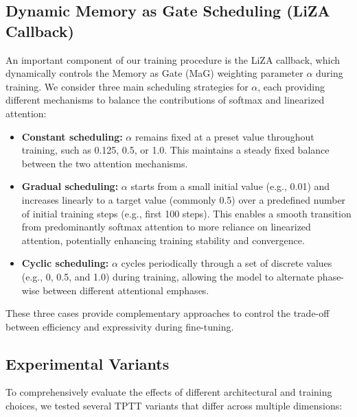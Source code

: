 \documentclass[10pt,a4paper]{article}
\begin{document}
\subsection{Dynamic Memory as Gate Scheduling (LiZA Callback)}

An important component of our training procedure is the LiZA callback, which dynamically controls the Memory as Gate (MaG) weighting parameter \(\alpha\) during training. We consider three main scheduling strategies for \(\alpha\), each providing different mechanisms to balance the contributions of softmax and linearized attention:

\begin{itemize}
    \item \textbf{Constant scheduling:} \(\alpha\) remains fixed at a preset value throughout training, such as 0.125, 0.5, or 1.0. This maintains a steady fixed balance between the two attention mechanisms.
    \item \textbf{Gradual scheduling:} \(\alpha\) starts from a small initial value (e.g., 0.01) and increases linearly to a target value (commonly 0.5) over a predefined number of initial training steps (e.g., first 100 steps). This enables a smooth transition from predominantly softmax attention to more reliance on linearized attention, potentially enhancing training stability and convergence.
    \item \textbf{Cyclic scheduling:} \(\alpha\) cycles periodically through a set of discrete values (e.g., 0, 0.5, and 1.0) during training, allowing the model to alternate phase-wise between different attentional emphases.
\end{itemize}

These three cases provide complementary approaches to control the trade-off between efficiency and expressivity during fine-tuning.

\subsection{Experimental Variants}

To comprehensively evaluate the effects of different architectural and training choices, we tested several TPTT variants that differ across multiple dimensions:
\end{document}
